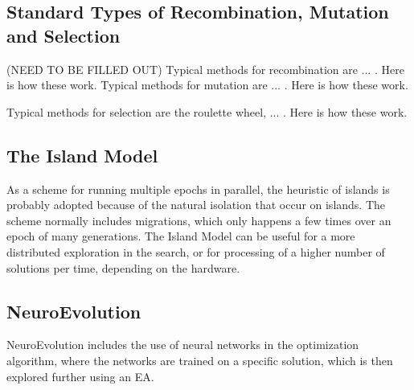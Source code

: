 \subsection{Standard Types of Recombination, Mutation and Selection}
(NEED TO BE FILLED OUT)
Typical methods for recombination are ... .
Here is how these work.
Typical methods for mutation are ... .
Here is how these work.

Typical methods for selection are the roulette wheel, ... .
Here is how these work.

\subsection{The Island Model}
As a scheme for running multiple epochs in parallel, the heuristic of islands is probably adopted because of the natural isolation that occur on islands.
The scheme normally includes migrations, which only happens a few times over an epoch of many generations.
The Island Model can be useful for a more distributed exploration in the search, or for processing of a higher number of solutions per time, depending on the hardware.

\subsection{NeuroEvolution}
NeuroEvolution includes the use of neural networks in the optimization algorithm, where the networks are trained on a specific solution, which is then explored further using an EA.



